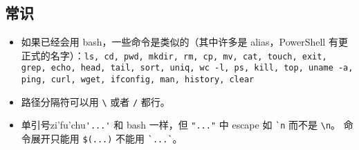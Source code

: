 
\subsection{常识}
\begin{itemize}
\item 如果已经会用 bash，一些命令是类似的（其中许多是 alias，PowerShell 有更正式的名字）：\verb`ls, cd, pwd, mkdir, rm, cp, mv, cat, touch, exit, grep, echo, head, tail, sort, uniq, wc -l, ps, kill, top, uname -a, ping, curl, wget, ifconfig, man, history, clear`
\item 路径分隔符可以用 \verb`\` 或者 \verb`/` 都行。
\item 单引号zi'fu'chu\verb`'...'` 和 bash 一样，但 \verb`"..."` 中 escape 如 \verb|`n| 而不是 \verb`\n`。 命令展开只能用 \verb`$(...)` 不能用 \verb|`...`|。
\end{itemize}

